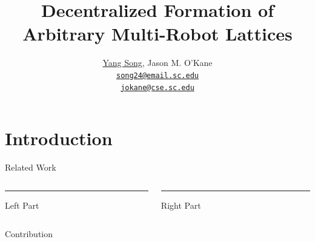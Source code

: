 \documentclass[10pt]{beamer}
\title{Decentralized Formation of Arbitrary Multi-Robot Lattices}
\author{
  \underline{Yang Song}, Jason M. O'Kane\\
  \href{mailto:song24@email.sc.edu}{{\tt song24@email.sc.edu} \\
  \href{mailto:jokane@cse.sc.edu}{\tt jokane@cse.sc.edu}}
}
\institute[
  Dept.\ of Computer Science and Engineering\\
  University of South Carolina
] %
{%
  Dept. of Computer Science and Engineering\\
  University of South Carolina
  
}
\begin{document}
\begin{frame}[plain] %
  \titlepage
\end{frame}

\section{Introduction}
\begin{frame}{Related Work}{}
  \begin{block}{}
    \begin{columns}[T] %
      \begin{column}{.48\textwidth}
        \color{red}\rule{\linewidth}{4pt}
        Left Part
      \end{column}%
      \hfill%
      \begin{column}{.48\textwidth}
        \color{blue}\rule{\linewidth}{4pt}
        Right Part
      \end{column}%
    \end{columns}
\end{block}
\end{frame}

\begin{frame}{Contribution}{}
\begin{block}{}
  \begin{columns}[T] %
    \begin{column}{.5\textwidth}
    \end{column}%
    \begin{column}{.5\textwidth}
    \end{column}%
  \end{columns} 
\end{block}
\end{frame}
\end{document}
